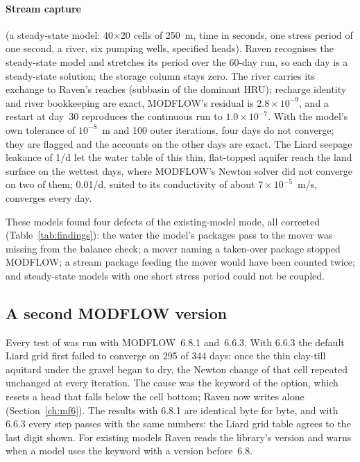 \paragraph{Stream capture} (a steady-state model: 40$\times$20 cells of 250~m, time in seconds, one stress period of one
second, a river, six pumping wells, specified heads). Raven recognises the steady-state model and stretches its period over
the 60-day run, so each day is a steady-state solution; the storage column stays zero. The river carries its exchange to
Raven's reaches (subbasin of the dominant HRU); recharge identity and river bookkeeping are exact, MODFLOW's residual is
$2.8\times10^{-9}$, and a restart at day~30 reproduces the continuous run to $1.0\times10^{-7}$. With the model's own
tolerance of $10^{-8}$~m and 100 outer iterations, four days do not converge; they are flagged and the accounts on the
other days are exact. The Liard seepage leakance of 1/d let the water table of this thin, flat-topped aquifer reach the land
surface on the wettest days, where MODFLOW's Newton solver did not converge on two of them; 0.01/d, suited to its
conductivity of about $7\times10^{-5}$~m/s, converges every day.

These models found four defects of the existing-model mode, all corrected (Table~\ref{tab:findings}): the water the model's
packages pass to the mover was missing from the balance check; a mover naming a taken-over package stopped MODFLOW;
a stream package feeding the mover would have been counted twice; and steady-state models with one short stress period
could not be coupled.

\subsection{A second MODFLOW version}
Every test of  was run with MODFLOW~6.8.1 and~6.6.3. With 6.6.3 the default Liard grid first failed
to converge on 295 of 344 days: once the thin clay-till aquitard under the gravel began to dry, the Newton change of that
cell repeated unchanged at every iteration. The cause was the  keyword of the  option,
which resets a head that falls below the cell bottom; Raven now writes  alone (Section~\ref{ch:mf6}). The
results with 6.8.1 are identical byte for byte, and with 6.6.3 every step passes with the same numbers: the Liard grid table
agrees to the last digit shown. For existing models Raven reads the library's version and warns when a model uses the
keyword with a version before~6.8.

